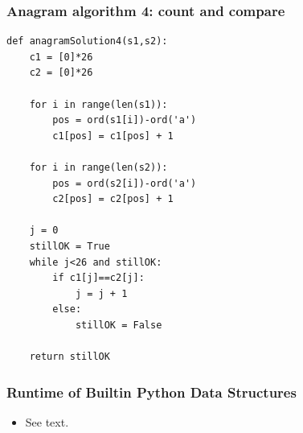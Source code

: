 \documentclass{beamer}
\newcommand{\bi}{\begin{itemize}}
\newcommand{\li}{\item}
\newcommand{\ei}{\end{itemize}}
\newcommand{\bfr}[1]{\begin{frame}[fragile]\frametitle{{ #1 }}}
\begin{document}
\bfr{Anagram algorithm 4: count and compare}
\begin{lstlisting}def anagramSolution4(s1,s2):
    c1 = [0]*26
    c2 = [0]*26

    for i in range(len(s1)):
        pos = ord(s1[i])-ord('a')
        c1[pos] = c1[pos] + 1

    for i in range(len(s2)):
        pos = ord(s2[i])-ord('a')
        c2[pos] = c2[pos] + 1

    j = 0
    stillOK = True
    while j<26 and stillOK:
        if c1[j]==c2[j]:
            j = j + 1
        else:
            stillOK = False

    return stillOK
\end{lstlisting}
\end{frame}

\bfr{Runtime of Builtin Python Data Structures}

\bi
\li See text.
\ei
\end{frame}
\end{document}
